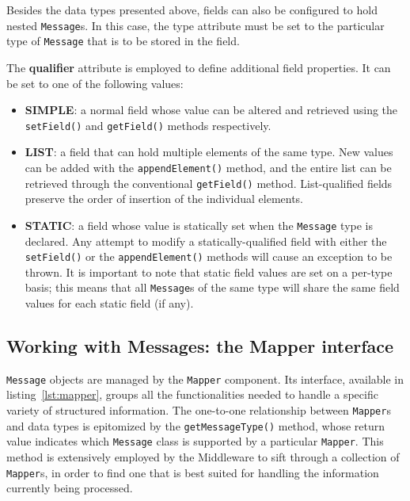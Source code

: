 Besides the data types presented above, fields can also be configured to hold
nested \texttt{Message}s. In this case, the type attribute must be set to the
particular type of \texttt{Message} that is to be stored in the field. 

The \textbf{qualifier} attribute is employed to define additional field
properties. It can be set to one of the following values:

\begin{itemize}

  \item \textbf{SIMPLE}: a normal field whose value can be altered and
      retrieved using the \texttt{setField()} and \texttt{getField()} methods
      respectively.

  \item \textbf{LIST}: a field that can hold multiple elements of the same
      type. New values can be added with the \texttt{appendElement()} method,
      and the entire list can be retrieved through the conventional
      \texttt{getField()} method. List-qualified fields preserve the order of
      insertion of the individual elements.

  \item \textbf{STATIC}: a field whose value is statically set when the
      \texttt{Message} type is declared. Any attempt to modify a
      statically-qualified field with either the \texttt{setField()} or the
      \texttt{appendElement()} methods will cause an exception to be thrown. It
      is important to note that static field values are set on a per-type
      basis; this means that all \texttt{Message}s of the same type will share
      the same field values for each static field (if any).
      
\end{itemize}


\subsection{Working with Messages: the Mapper interface}

\texttt{Message} objects are managed by the \texttt{Mapper} component. Its
interface, available in listing~\ref{lst:mapper}, groups all the
functionalities needed to handle a specific variety of structured information.
The one-to-one relationship between \texttt{Mapper}s and data types is
epitomized by the \texttt{getMessageType()} method, whose return value
indicates which \texttt{Message} class is supported by a particular
\texttt{Mapper}. This method is extensively employed by the Middleware to sift
through a collection of \texttt{Mapper}s, in order to find one that is best
suited for handling the information currently being processed.

